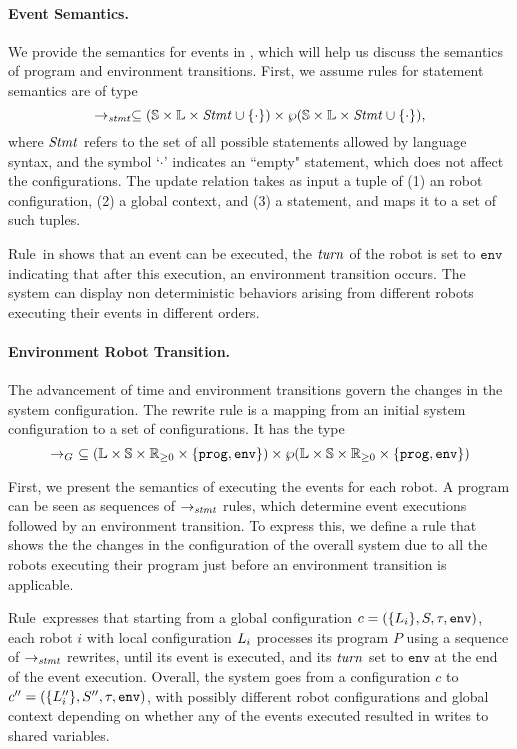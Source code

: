 \paragraph{Event Semantics.}
We provide the semantics for events in \lgname,
which will help us discuss the semantics of program and environment transitions.
First, we assume rules for statement semantics are of type
\[
\rightarrow_\mathit{stmt} \subseteq (\mathbb{S} \times \mathbb{L}\times \mathit{Stmt} \cup \{\cdot\}) \times \wp(\mathbb{S}\times \mathbb{L} \times \mathit{Stmt} \cup \{\cdot\}),
\]
where $\mathit{Stmt}$ refers to the set of all possible statements allowed by language syntax,
and the symbol `$\cdot$' indicates an ``empty" statement, which does not affect the configurations.
The update relation takes as input a tuple of (1) an robot configuration, (2) a global context, and (3) a statement, and maps it to a set of such tuples.

Rule~\EventRule in  shows that an event can be executed,
the $\mathit{turn}$ of the robot is set to $\mathtt{env}$ indicating that after this execution, an environment transition occurs.
The system can display non deterministic behaviors arising from different robots executing their events in different orders.


\paragraph{Environment Robot Transition.}

The advancement of time and environment transitions govern the changes in the system configuration.
The rewrite rule is a mapping from an initial system configuration to a set of configurations.
It has the type
$$\rightarrow_G\ \subseteq (\pwl\times \pws \times \nnreals \times \{\mathtt{prog,env}\}) \times \wp(\pwl\times\pws \times \nnreals\times \{\mathtt{prog,env}\}) $$

First, we present the semantics of executing the events for each robot.
A \lgname program can be seen as sequences of $\rightarrow_\mathit{stmt}$ rules, which determine event executions followed by an environment transition.
To express this, we define a rule that shows the the changes in the configuration of the overall system due to all the robots executing their program just before an environment transition is applicable.

Rule~\RunSysRule expresses that starting from a global configuration $c = (\{L_{i}\}, S, \tau, \mathtt{env})$,
each robot $i$ with local configuration $L_{i}$ processes its program $P$ using a sequence of $\rightarrow_\mathit{stmt}$ rewrites,
until its event is executed,
and its $\mathit{turn}$ set to $\mathtt{env}$ at the end of the event execution.
Overall, the system goes from a configuration $c$ to $c^{\prime\prime}= (\{L_{i}^{\prime\prime}\}, S^{\prime\prime}, \tau, \mathtt{env})$,
with possibly different robot configurations and global context depending on
whether any of the events executed resulted in writes to shared variables.

